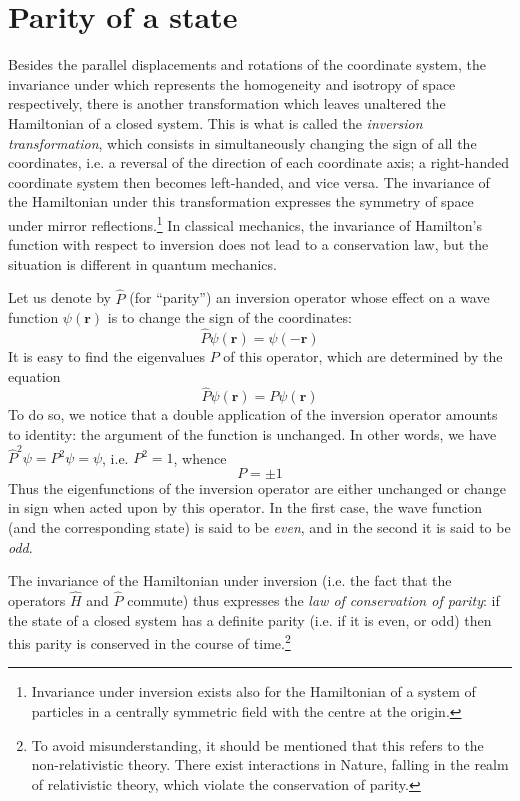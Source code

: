 \section{Parity of a state}\label{Parity of a state}


Besides the parallel displacements and rotations of the coordinate system, the invariance under which represents the homogeneity and isotropy of space respectively, there is another transformation which leaves unaltered the Hamiltonian of a closed system. This is what is called the \textit{inversion transformation}, which consists in simultaneously changing the sign of all the coordinates, i.e. a reversal of the direction of each coordinate axis; a right-handed coordinate system then becomes left-handed, and vice versa. The invariance of the Hamiltonian under this transformation expresses the symmetry of space under mirror reflections.\footnote{Invariance under inversion exists also for the Hamiltonian of a system of particles in a centrally symmetric field with the centre at the origin.
} In classical mechanics, the invariance of Hamilton’s function with respect to inversion does not lead to a conservation law, but the situation is different in quantum mechanics.

Let us denote by $\hat{P}$ (for “parity”) an inversion operator whose effect on a wave function $\psi(\bm{r})$ is to change the sign of the coordinates:
\begin{equation}\label{30.1}
\hat{P}\psi(\bm{r})=\psi(-\bm{r})
\end{equation}
It is easy to find the eigenvalues $ P $ of this operator, which are determined by the equation
\begin{equation}\label{30.2}
\hat{P}\psi(\bm{r})=P\psi(\bm{r})
\end{equation}
To do so, we notice that a double application of the inversion operator amounts to identity: the argument of the function is unchanged. In other words, we have $ \hat{P}^2\psi=P^2\psi=\psi $, i.e. $ P^2 = 1 $, whence
\begin{equation}\label{30.3}
P=\pm 1
\end{equation}
Thus the eigenfunctions of the inversion operator are either unchanged or change in sign when acted upon by this operator. In the first case, the wave function (and the corresponding state) is said to be \textit{even}, and in the second it is said to be \textit{odd}.

The invariance of the Hamiltonian under inversion (i.e. the fact that the operators $\hat{H}$ and $ \hat{P} $ commute) thus expresses the \textit{law of conservation of parity}: if the state of a closed system has a definite parity (i.e. if it is even, or odd) then this parity is conserved in the course of time.\footnote{To avoid misunderstanding, it should be mentioned that this refers to the non-relativistic theory. There exist interactions in Nature, falling in the realm of relativistic theory, which violate the conservation of parity.
}


